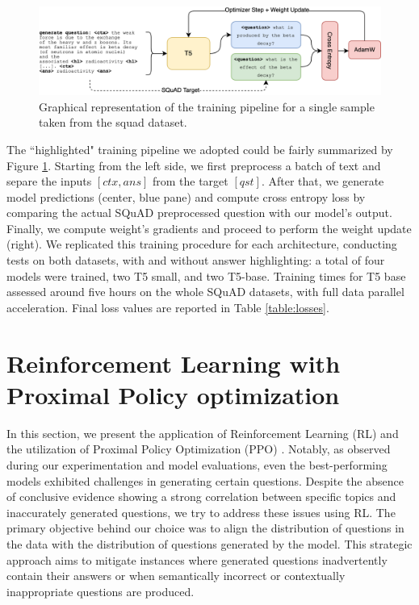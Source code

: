 \documentclass{article}
\begin{document}
\begin{figure}
    \centering
    \includegraphics[width=\textwidth]{assets/training-loop.drawio.png}
    \caption{Graphical representation of the training pipeline for a single sample taken from the squad dataset.}
    \label{fig:trpipeline}
\end{figure}
The ``highlighted" training pipeline we adopted could be fairly summarized by Figure \ref{fig:trpipeline}. Starting from the left side, we first preprocess a batch of text and separe the inputs $[ctx, ans]$ from the target $[qst]$. After that, we generate model predictions (center, blue pane) and compute cross entropy loss by comparing the actual SQuAD preprocessed question with our model's output. Finally, we compute weight's gradients and proceed to perform the weight update (right). We replicated this training procedure for each architecture, conducting tests on both datasets, with and without answer highlighting: a total of four models were trained, two T5 small, and two T5-base. Training times for T5 base assessed around five hours on the whole SQuAD datasets, with full data parallel acceleration. Final loss values are reported in Table \ref{table:losses}.

\section{Reinforcement Learning with Proximal Policy optimization}
In this section, we present the application of Reinforcement Learning (RL) and the utilization of Proximal Policy Optimization (PPO) \cite{schulman2017proximal}. Notably, as observed during our experimentation and model evaluations, even the best-performing models exhibited challenges in generating certain questions. Despite the absence of conclusive evidence showing a strong correlation between specific topics and inaccurately generated questions, we try to address these issues using RL. The primary objective behind our choice was to align the distribution of questions in the data with the distribution of questions generated by the model. This strategic approach aims to mitigate instances where generated questions inadvertently contain their answers or when semantically incorrect or contextually inappropriate questions are produced.
\end{document}
